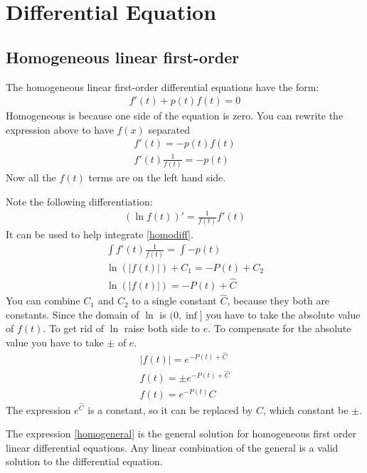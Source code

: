 \chapter{Differential Equation}
\section{Homogeneous linear first-order}
The homogeneous linear first-order differential equations have the form:
\begin{align*}
   f'(t) + p(t)f(t) = 0
\end{align*}
Homogeneous is because one side of the equation is zero.
You can rewrite the expression above to have \(f(x)\) separated
\begin{gather}
   f'(t)  = -p(t)f(t) \\
   f'(t) \frac{1}{f(t)} = -p(t) \label{homodiff}
\end{gather}
Now all the \(f(t)\) terms are on the left hand side.

Note the following differentiation:
\begin{gather}
   (\ln f(t))' = \frac{1}{f(t)} f'(t)
\end{gather}
It can be used to help integrate \ref{homodiff}.
\begin{gather*}
   \int f'(t) \frac{1}{f(t)} = \int -p(t) \\
   \ln(|f(t)|) + C_1  =- P(t) + C_2 \\
   \ln(|f(t)|)  = -P(t) + \hat{C}
\end{gather*}
You can combine \(C_1\) and \(C_2\) to a single constant \(\hat{C}\), because they
both are constants.
Since the domain of \( \ln \) is \((0, \inf]\) you have to take the absolute value of \(f(t)\).
To get rid of \(\ln\) raise both side to \( e \). To compensate for the absolute value
you have to take \(\pm\) of \(e\).
\begin{gather}
   |f(t)| = e^{-P(t) + \hat{C}} \\
   f(t) = \pm e^{-P(t) + \hat{C}} \\
   f(t) =  e^{-P(t)} C \label{homogeneral}
\end{gather}
The expression \(e^{\hat{C}}\) is a constant, so it can be replaced by \(C\), which constant
be \(\pm\).

The expression \ref{homogeneral} is the general solution for homogeneous first order
linear differential equations. Any linear combination of the general is a valid solution
to the differential equation.
